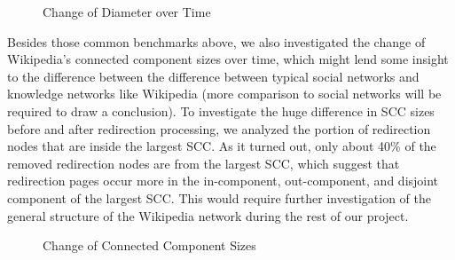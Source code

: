 \documentclass[10pt]{article}
\begin{document}
\begin{multicols}{2}
\begin{figure}[H]
\caption{Change of Diameter over Time\label{fig:diameter}}
\end{figure}

Besides those common benchmarks above, we also investigated the change of Wikipedia's connected component sizes over time, which might lend some insight to the difference between the difference between typical social networks and knowledge networks like Wikipedia (more comparison to social networks will be required to draw a conclusion). To investigate the huge difference in SCC sizes before and after redirection processing, we analyzed the portion of redirection nodes that are inside the largest SCC. As it turned out, only about 40\% of the removed redirection nodes are from the largest SCC, which suggest that redirection pages occur more in the in-component, out-component, and disjoint component of the largest SCC. This would require further investigation of the general structure of the Wikipedia network during the rest of our project.

\begin{figure}[H]
\caption{Change of Connected Component Sizes \label{fig:cc}}
\end{figure}


\end{multicols}
\end{document}
